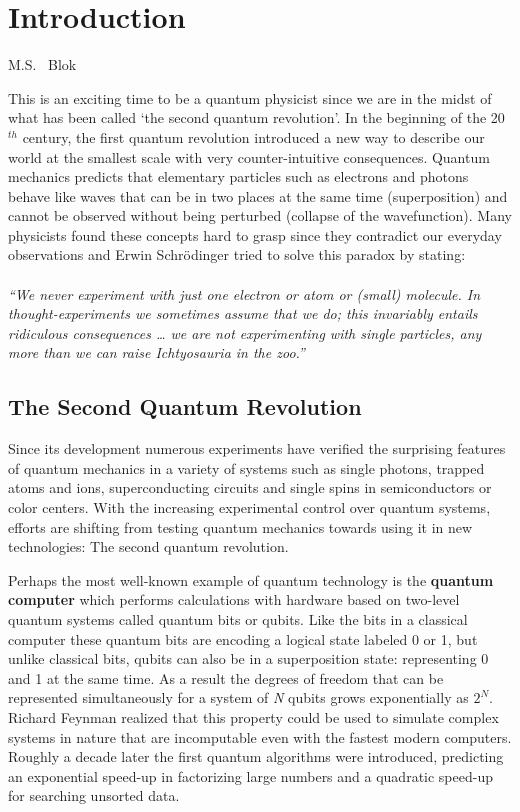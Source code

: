 \graphicspath{{./ch_introduction/figures/}}

\chapter{Introduction}
\label{ch:intro}

\begin{center} 
    \vspace{-1cm} {M.S. ~Blok} 
\end{center}

This is an exciting time to be a quantum physicist since we are in the midst of what has been called `the second quantum revolution'.
In the beginning of the 20$^{th}$ century, the first quantum revolution introduced a new way to describe our world at the smallest scale with very counter-intuitive consequences. Quantum mechanics predicts that elementary particles such as electrons and photons behave like waves that can be in two places at the same time (superposition) and cannot be observed without being perturbed (collapse of the wavefunction). Many physicists found these concepts hard to grasp since they contradict our everyday observations and Erwin Schr\"{o}dinger tried to solve this paradox by stating: 
\\
\\
\textit{``We never experiment with just one electron or atom or (small) molecule. In  thought-experiments we sometimes assume that we do; this invariably entails ridiculous consequences … we are not experimenting with single particles, any more than we can raise Ichtyosauria in the zoo.''}
\\

\section{The Second Quantum Revolution}
Since its development numerous experiments have verified the surprising features of quantum mechanics in a variety of systems such as single photons, trapped atoms and ions, superconducting circuits and single spins in semiconductors or color centers. With the increasing experimental control over quantum systems, efforts are shifting from testing quantum mechanics towards using it in new technologies: The second quantum revolution.

Perhaps the most well-known example of quantum technology is the \textbf{quantum computer} which performs calculations with hardware based on two-level quantum systems called quantum bits or qubits. Like the bits in a classical computer these quantum bits are encoding a logical state labeled 0 or 1, but unlike classical bits, qubits can also be in a superposition state: representing 0 and 1 at the same time. As a result the degrees of freedom that can be represented simultaneously for a system of \textit{N} qubits grows exponentially as $2^N$. Richard Feynman realized that this property could be used to simulate complex systems in nature that are incomputable even with the fastest modern computers. Roughly a decade later the first quantum algorithms were introduced, predicting an exponential speed-up in factorizing large numbers and a quadratic speed-up for searching unsorted data.

